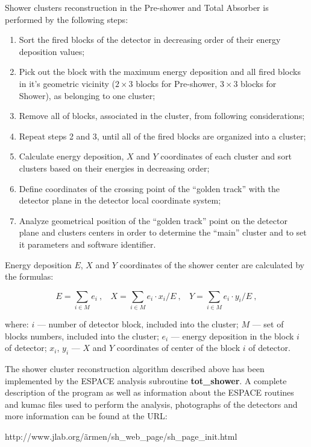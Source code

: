 \documentclass[12pt]{article}
\begin{document}
Shower clusters reconstruction in the Pre-shower and
Total Absorber is performed by the following steps:
\begin{enumerate}
\item Sort the fired blocks of the detector in decreasing order of their 
      energy deposition values;
\item Pick out the block with the maximum energy deposition and all fired blocks in
      it's geometric vicinity ($2 \times 3$ blocks for Pre-shower, $3 \times 3$ blocks
      for Shower), as belonging to one cluster;

\item Remove all of blocks, associated in the cluster, from following
      considerations;
\item Repeat steps 2 and 3, until all of the fired blocks are organized into 
      a cluster;
\item Calculate energy deposition, $X$ and $Y$ coordinates of each cluster and 
      sort clusters based on their energies in decreasing order;
\item Define coordinates of the crossing point of the ``golden track'' with the detector 
      plane in the detector local coordinate system;
\item Analyze geometrical position of the ``golden track'' point on the 
      detector plane and clusters centers in order to determine the ``main'' 
      cluster and to set it parameters and software identifier.
\end{enumerate}

Energy deposition $E$, $X$ and $Y$ coordinates of the shower center are 
calculated by the formulas: 

$$E=\sum_{i \in M}e_i\ ,\ \ \ \ 
X=\sum_{i \in M}e_i \cdot x_i/E\ ,\ \ \ \ Y=\sum_{i \in M}e_i \cdot y_i/E\ ,$$

where: $i$ --- number of detector block, included into the cluster; $M$ --- set
of blocks numbers, included into the cluster; $e_i$ --- energy deposition in 
the block $i$ of detector; $x_i$, $y_i$ --- $X$ and $Y$ coordinates of center 
of the block $i$ of detector.

The shower cluster reconstruction algorithm described above has been
implemented by the ESPACE analysis subroutine {\bf tot\_shower}.  A
complete description of the program as well as information about the
ESPACE routines and kumac files used to perform the analysis,
photographs of the detectors and more information can be found at the
URL:

http://www.jlab.org/\~ armen/sh\_web\_page/sh\_page\_init.html
\end{document}
